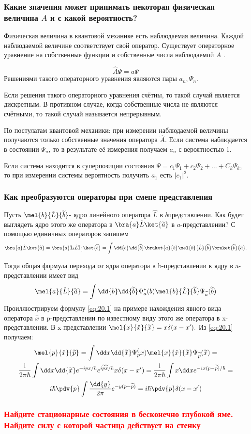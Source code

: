 \subsubsection{Какие значения может принимать некоторая физическая величина $A$ и с какой вероятность?
}


Физическая величина в квантовой механике есть наблюдаемая величина. Каждой наблюдаемой величине соответствует свой оператор. Существует операторное уравнение на собственные функции и собственные числа наблюдаемой $A$ .

$$\hat{A}\Psi=a\Psi$$
Решениями такого операторного уравнения являются пары $a_n,\Psi_n$. 

Если решения такого операторного уравнения счётны, то такой случай является дискретным. В противном случае, когда собственные числа не являются счётными, то такой случай называется непрерывным.

По постулатам квантовой механики: при измерении наблюдаемой величины получаются только собственные значения оператора $\hat{A}$. Если система наблюдается в состоянии $\Psi_n$,  то в результате её измерения получаем $a_n$ с вероятностью 1.

Если система находится в суперпозиции состояния $\Psi=c_1\Psi_1+c_2\Psi_2+\dots+C_k\Psi_k$, то при измерении системы вероятность получить $a_1$ есть $|c_1|^2$.

\subsubsection{ {Как преобразуются операторы при смене представления} }

Пусть $\mel{b}{\hat{L}}{\tilde{b}}$- ядро линейного оператора $\hat{L}$ в $b$представлении. Как будет выглядеть ядро этого же оператора в 
$\bra{a}\hat{L}\ket{\tilde{a}}$  в $a$-представлении? С помощью единичных операторов запишем
$$\bra{a}\hat{L}\ket{\tilde{a}}=\bra{a}\hat{1}_b\hat{L}\hat{1}_{\tilde a}\ket{\tilde{b}}=
\int \dd{b}\dd{\tilde{b}}\braket{a}{b}
\mel{b}{\hat{L}}{\tilde{b} }
\braket{\tilde{b}}{\tilde{a}}.$$


Тогда общая формула перехода от ядра оператора в b-представлении к ядру в a-представлении имеет вид
\begin{equation}
	\label{eq:20.1}
	\mel{a}{\hat{L}}{\tilde a}=\int \dd{b}\dd{\tilde b} \Psi_a^*(b)\mel{b}{\hat L}{\tilde b} \Psi_{\tilde a}(\tilde b)
\end{equation}
Проиллюстрируем формулу \eqref{eq:20.1} на примере нахождения явного вида оператора $\hat x$ в p-представлении по известному виду этого же оператора в x-представлении. В x-представлении $\mel{x}{\hat x}{\tilde x}=x\delta(x-x').$ Из \eqref{eq:20.1} получаем:
\begin{gather*}
	\mel{p}{\hat x}{\tilde p}=\int \dd x \dd{\tilde x} \Psi_p^(x)\mel{x}{\hat x }{\tilde x}\Psi_{\tilde p}(\tilde x)=
	\\
	\frac{1}{2\pi\hbar}\int \dd x \dd{\tilde x} e^{-ipx/\hbar}e^{i\tilde p \tilde x/\hbar}x \delta(x-x')=\frac{1}{2\pi\hbar}\int x\dd x e^{-ix(p-\tilde p)/\hbar}=\\
	i\hbar\pdv{p}\int \frac{\dd{y}}{2\pi}e^{-y(p-\tilde p)}=i\hbar\pdv{p} \delta(x-x')
\end{gather*}

\subsubsection{\textcolor{red} {Найдите стационарные состояния в бесконечно глубокой яме. Найдите силу с
которой частица действует на стенку} }